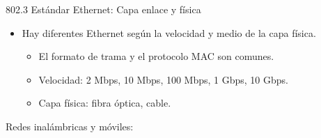 \documentclass[12pt, twoside, openright]{report} %
\begin{document}
802.3 Estándar Ethernet: Capa enlace y física

\begin{itemize}
	\item Hay diferentes Ethernet según la velocidad y medio de la capa
	      física.

	      \begin{itemize}
		      \item El formato de trama y el protocolo MAC son comunes.
		      \item Velocidad: 2 Mbps, 10 Mbps, 100 Mbps, 1 Gbps, 10 Gbps.
		      \item Capa física: fibra óptica, cable.
	      \end{itemize}
\end{itemize}

Redes inalámbricas y móviles:
\end{document}
